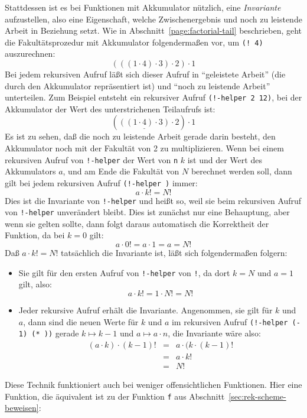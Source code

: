 Stattdessen ist es bei Funktionen mit Akkumulator nützlich, eine
\textit{Invariante} aufzustellen, also eine
Eigenschaft, welche Zwischenergebnis und noch zu leistende Arbeit in
Beziehung setzt.  Wie in Abschnitt~\ref{page:factorial-tail}
beschrieben, geht die Fakultätsprozedur mit Akkumulator folgendermaßen
vor, um \texttt{(! 4)} auszurechnen:
%
\begin{displaymath}
  (((1 \cdot 4)\cdot 3)\cdot 2)\cdot 1
\end{displaymath}
%
Bei jedem rekursiven Aufruf läßt sich dieser Aufruf in "`geleistete
Arbeit"' (die durch den Akkumulator repräsentiert ist) und "`noch zu
leistende Arbeit"' unterteilen.  Zum Beispiel entsteht ein rekursiver
Aufruf \texttt{(!-helper 2 12)}, bei der Akkumulator der Wert des
unterstrichenen Teilaufrufs ist:
%
\begin{displaymath}
  (\underline{((1 \cdot 4)\cdot 3)}\cdot 2)\cdot 1
\end{displaymath}
%
Es ist zu sehen, daß die noch zu leistende Arbeit gerade darin
besteht, den Akkumulator noch mit der Fakultät von 2 zu
multiplizieren.  Wenn bei einem rekursiven Aufruf von \texttt{!-helper} der
Wert von \texttt{n} $k$ ist und der Wert des Akkumulators $a$, und am
Ende die Fakultät von $N$ berechnet werden soll, dann gilt bei jedem
rekursiven Aufruf \texttt{(!-helper  )} immer:
%
\begin{displaymath}
  a \cdot k! = N!
\end{displaymath}
%
Dies ist die Invariante von \texttt{!-helper} und heißt so, weil sie beim
rekursiven Aufruf von \texttt{!-helper} unverändert bleibt.  Dies
ist zunächst nur eine Behauptung, aber wenn sie gelten sollte, dann
folgt daraus automatisch die Korrektheit der Funktion, da bei $k=0$
gilt:
%
\begin{displaymath}
  a \cdot 0! = a \cdot 1 = a = N!
\end{displaymath}
%
Daß $a \cdot k! = N!$ tatsächlich die Invariante ist, läßt sich
folgendermaßen folgern:
%
\begin{itemize}
\item Sie gilt für den ersten Aufruf von \texttt{!-helper} von
  \texttt{!}, da dort $k=N$ und $a=1$ gilt, also:
  \begin{displaymath}
    a \cdot k! = 1 \cdot N! = N!
  \end{displaymath}
\item Jeder rekursive Aufruf erhält die Invariante.  Angenommen, sie
  gilt für $k$ und $a$, dann sind die neuen Werte für $k$ und $a$ im
  rekursiven Aufruf \texttt{(!-helper (-  1) (*  ))} gerade
  $k\mapsto k-1$ und $a \mapsto a\cdot n$, die Invariante wäre also:
  \begin{eqnarray*}
    (a \cdot k) \cdot (k-1)! &=& a \cdot (k \cdot (k-1)!\\
    &=& a\cdot k!\\
    &=& N!
  \end{eqnarray*}
\end{itemize}
%
Diese Technik funktioniert auch bei weniger offensichtlichen
Funktionen.  Hier eine Funktion, die äquivalent ist zu der Funktion
\texttt{f} aus Abschnitt~\ref{sec:rek-scheme-beweisen}:


